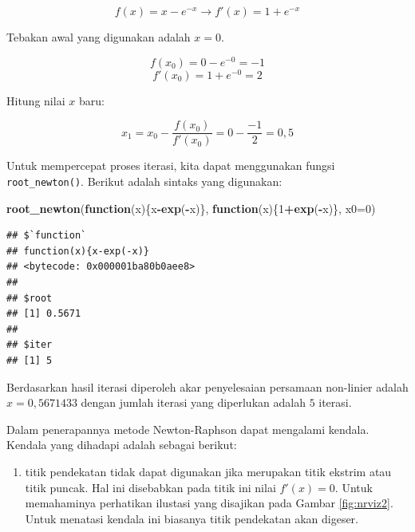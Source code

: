 \documentclass[
]{book}
\newenvironment{Shaded}{\begin{snugshade}}{\end{snugshade}}
\newcommand{\AttributeTok}[1]{\textcolor[rgb]{0.13,0.29,0.53}{#1}}
\newcommand{\ControlFlowTok}[1]{\textcolor[rgb]{0.13,0.29,0.53}{\textbf{#1}}}
\newcommand{\DecValTok}[1]{\textcolor[rgb]{0.00,0.00,0.81}{#1}}
\newcommand{\FunctionTok}[1]{\textcolor[rgb]{0.13,0.29,0.53}{\textbf{#1}}}
\newcommand{\NormalTok}[1]{#1}
\newcommand{\SpecialCharTok}[1]{\textcolor[rgb]{0.81,0.36,0.00}{\textbf{#1}}}
\providecommand{\tightlist}{%
  \setlength{\itemsep}{0pt}\setlength{\parskip}{0pt}}
\theoremstyle{definition}
\theoremstyle{definition}
\theoremstyle{definition}
\theoremstyle{definition}
\theoremstyle{remark}
\begin{document}
\[
f\left(x\right)=x-e^{-x}\to f'\left(x\right)=1+e^{-x}
\]

Tebakan awal yang digunakan adalah \(x=0\).

\[
f\left(x_0\right)=0-e^{-0}=-1
\]
\[
f'\left(x_0\right)=1+e^{-0}=2
\]

Hitung nilai \(x\) baru:

\[
x_1=x_0-\frac{f\left(x_0\right)}{f'\left(x_0\right)}=0-\frac{-1}{2}=0,5
\]

Untuk mempercepat proses iterasi, kita dapat menggunakan fungsi \texttt{root\_newton()}. Berikut adalah sintaks yang digunakan:

\begin{Shaded}
\begin{Highlighting}[]
\FunctionTok{root\_newton}\NormalTok{(}\ControlFlowTok{function}\NormalTok{(x)\{x}\SpecialCharTok{{-}}\FunctionTok{exp}\NormalTok{(}\SpecialCharTok{{-}}\NormalTok{x)\},}
            \ControlFlowTok{function}\NormalTok{(x)\{}\DecValTok{1}\SpecialCharTok{+}\FunctionTok{exp}\NormalTok{(}\SpecialCharTok{{-}}\NormalTok{x)\},}
              \AttributeTok{x0=}\DecValTok{0}\NormalTok{)}
\end{Highlighting}
\end{Shaded}

\begin{verbatim}
## $`function`
## function(x){x-exp(-x)}
## <bytecode: 0x000001ba80b0aee8>
## 
## $root
## [1] 0.5671
## 
## $iter
## [1] 5
\end{verbatim}

Berdasarkan hasil iterasi diperoleh akar penyelesaian persamaan non-linier adalah \(x=0,5671433\) dengan jumlah iterasi yang diperlukan adalah \(5\) iterasi.

Dalam penerapannya metode Newton-Raphson dapat mengalami kendala. Kendala yang dihadapi adalah sebagai berikut:

\begin{enumerate}
\def\labelenumi{\arabic{enumi}.}
\tightlist
\item
  titik pendekatan tidak dapat digunakan jika merupakan titik ekstrim atau titik puncak. Hal ini disebabkan pada titik ini nilai \(f'\left(x \right)=0\). Untuk memahaminya perhatikan ilustasi yang disajikan pada Gambar \ref{fig:nrviz2}. Untuk menatasi kendala ini biasanya titik pendekatan akan digeser.
\end{enumerate}
\end{document}
